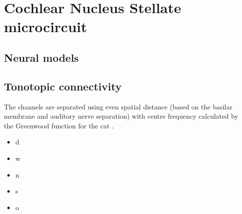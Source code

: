 




\section{Cochlear Nucleus Stellate microcircuit    \label{sec:CN:cochl-nucl-stell}}

\subsection{Neural models}




\subsection{Tonotopic connectivity    \label{sec:CN:tonot-conn}}

The channels are separated using even spatial distance (based on the
basilar membrane and auditory nerve separation) with centre frequency
calculated by the Greenwood function for the cat
\citep{Greenwood:1990}. 

\begin{itemize}

\item  \gls{d}

\item  \gls{w}

\item  \gls{n}

\item  \gls{s}

\item  \gls{o}
\end{itemize}



